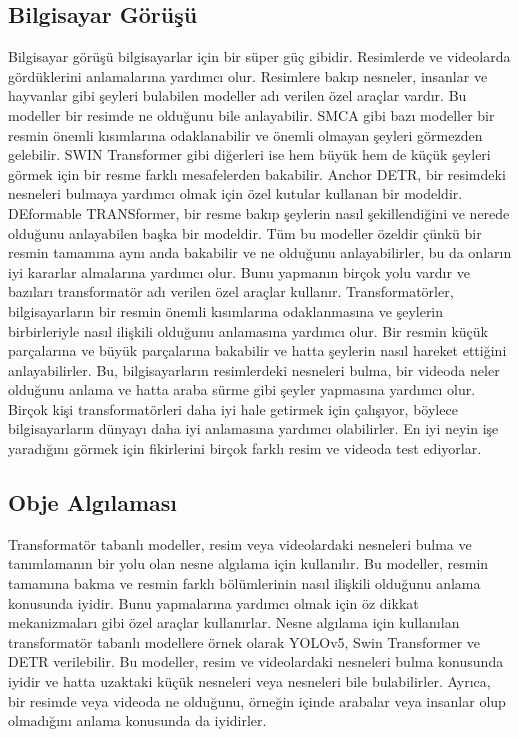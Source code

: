 \documentclass{article}
\begin{document}
\subsection{Bilgisayar Görüşü}
Bilgisayar görüşü bilgisayarlar için bir süper güç gibidir.
Resimlerde ve videolarda gördüklerini anlamalarına yardımcı olur.
Resimlere bakıp nesneler, insanlar ve hayvanlar gibi şeyleri bulabilen modeller adı verilen özel araçlar vardır.
Bu modeller bir resimde ne olduğunu bile anlayabilir.
SMCA gibi bazı modeller bir resmin önemli kısımlarına odaklanabilir ve önemli olmayan şeyleri görmezden gelebilir.
SWIN Transformer gibi diğerleri ise hem büyük hem de küçük şeyleri görmek için bir resme farklı mesafelerden bakabilir.
Anchor DETR, bir resimdeki nesneleri bulmaya yardımcı olmak için özel kutular kullanan bir modeldir.
DEformable TRANSformer, bir resme bakıp şeylerin nasıl şekillendiğini ve nerede olduğunu anlayabilen başka bir modeldir.
Tüm bu modeller özeldir çünkü bir resmin tamamına aynı anda bakabilir ve ne olduğunu anlayabilirler, bu da onların iyi kararlar almalarına yardımcı olur.
Bunu yapmanın birçok yolu vardır ve bazıları transformatör adı verilen özel araçlar kullanır. Transformatörler, bilgisayarların bir resmin önemli kısımlarına odaklanmasına ve şeylerin birbirleriyle nasıl ilişkili olduğunu anlamasına yardımcı olur.
Bir resmin küçük parçalarına ve büyük parçalarına bakabilir ve hatta şeylerin nasıl hareket ettiğini anlayabilirler.
Bu, bilgisayarların resimlerdeki nesneleri bulma, bir videoda neler olduğunu anlama ve hatta araba sürme gibi şeyler yapmasına yardımcı olur.
Birçok kişi transformatörleri daha iyi hale getirmek için çalışıyor, böylece bilgisayarların dünyayı daha iyi anlamasına yardımcı olabilirler.
En iyi neyin işe yaradığını görmek için fikirlerini birçok farklı resim ve videoda test ediyorlar.
\subsection{Obje Algılaması}
Transformatör tabanlı modeller, resim veya videolardaki nesneleri bulma ve tanımlamanın bir yolu olan nesne algılama için kullanılır.
Bu modeller, resmin tamamına bakma ve resmin farklı bölümlerinin nasıl ilişkili olduğunu anlama konusunda iyidir.
Bunu yapmalarına yardımcı olmak için öz dikkat mekanizmaları gibi özel araçlar kullanırlar.
Nesne algılama için kullanılan transformatör tabanlı modellere örnek olarak YOLOv5, Swin Transformer ve DETR verilebilir.
Bu modeller, resim ve videolardaki nesneleri bulma konusunda iyidir ve hatta uzaktaki küçük nesneleri veya nesneleri bile bulabilirler.
Ayrıca, bir resimde veya videoda ne olduğunu, örneğin içinde arabalar veya insanlar olup olmadığını anlama konusunda da iyidirler.
\end{document}

